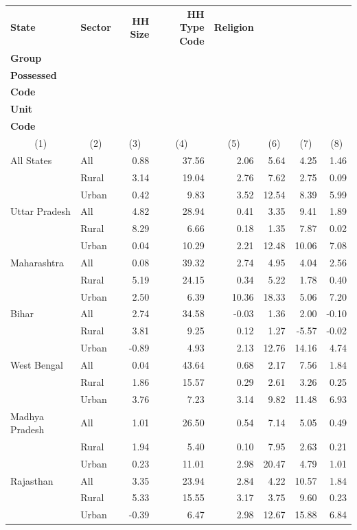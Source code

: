\label{tab:Table 10}
\begin{tabular}{llrrrrrr}
\toprule
\textbf{State} & \textbf{Sector} & \textbf{HH Size} & \textbf{HH Type Code} & \textbf{Religion} & \makecell{\textbf{Social}\\ \textbf{Group}} & \makecell{\textbf{Land}\\ \textbf{Possessed}\\ \textbf{Code}} & \makecell{\textbf{Dwelling}\\ \textbf{Unit}\\ \textbf{Code}}\\
\multicolumn{1}{c}{(1)} & \multicolumn{1}{c}{(2)} & \multicolumn{1}{c}{(3)} & \multicolumn{1}{c}{(4)} & \multicolumn{1}{c}{(5)} & \multicolumn{1}{c}{(6)} & \multicolumn{1}{c}{(7)} & \multicolumn{1}{c}{(8)} \\
\midrule
All States & All & 0.88 & 37.56 & 2.06 & 5.64 & 4.25 & 1.46\\
 & Rural & 3.14 & 19.04 & 2.76 & 7.62 & 2.75 & 0.09\\
 & Urban & 0.42 & 9.83 & 3.52 & 12.54 & 8.39 & 5.99\\
\addlinespace
Uttar Pradesh & All & 4.82 & 28.94 & 0.41 & 3.35 & 9.41 & 1.89\\
 & Rural & 8.29 & 6.66 & 0.18 & 1.35 & 7.87 & 0.02\\
 & Urban & 0.04 & 10.29 & 2.21 & 12.48 & 10.06 & 7.08\\
\addlinespace
Maharashtra & All & 0.08 & 39.32 & 2.74 & 4.95 & 4.04 & 2.56\\
 & Rural & 5.19 & 24.15 & 0.34 & 5.22 & 1.78 & 0.40\\
 & Urban & 2.50 & 6.39 & 10.36 & 18.33 & 5.06 & 7.20\\
\addlinespace
Bihar & All & 2.74 & 34.58 & -0.03 & 1.36 & 2.00 & -0.10\\
 & Rural & 3.81 & 9.25 & 0.12 & 1.27 & -5.57 & -0.02\\
 & Urban & -0.89 & 4.93 & 2.13 & 12.76 & 14.16 & 4.74\\
\addlinespace
West Bengal & All & 0.04 & 43.64 & 0.68 & 2.17 & 7.56 & 1.84\\
 & Rural & 1.86 & 15.57 & 0.29 & 2.61 & 3.26 & 0.25\\
 & Urban & 3.76 & 7.23 & 3.14 & 9.82 & 11.48 & 6.93\\
\addlinespace
Madhya Pradesh & All & 1.01 & 26.50 & 0.54 & 7.14 & 5.05 & 0.49\\
 & Rural & 1.94 & 5.40 & 0.10 & 7.95 & 2.63 & 0.21\\
 & Urban & 0.23 & 11.01 & 2.98 & 20.47 & 4.79 & 1.01\\
\addlinespace
Rajasthan & All & 3.35 & 23.94 & 2.84 & 4.22 & 10.57 & 1.84\\
 & Rural & 5.33 & 15.55 & 3.17 & 3.75 & 9.60 & 0.23\\
 & Urban & -0.39 & 6.47 & 2.98 & 12.67 & 15.88 & 6.84\\
\bottomrule
\end{tabular}
